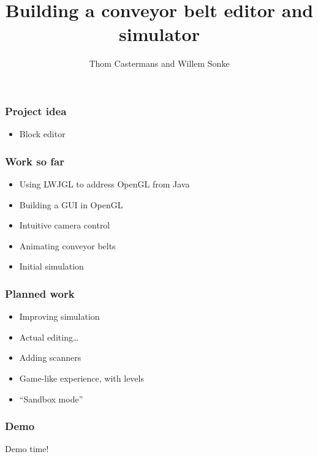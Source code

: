 \documentclass[12pt, aspectratio=169]{beamer} %
\title{Building a conveyor belt editor and simulator}
\author{Thom Castermans and Willem Sonke}
\begin{document}
\begin{titleframe}
\end{titleframe}

\begin{frame}
  \frametitle{Project idea}
  \begin{itemize}
    \item Block editor
  \end{itemize}
\end{frame}

\begin{frame}
  \frametitle{Work so far}
  \begin{itemize}
    \item Using LWJGL to address OpenGL from Java
    \item Building a GUI in OpenGL
    \item Intuitive camera control
    \item Animating conveyor belts
    \item Initial simulation
  \end{itemize}
\end{frame}

\begin{frame}
  \frametitle{Planned work}
  \begin{itemize}
    \item Improving simulation
    \item Actual editing\ldots
    \item Adding scanners
    \item Game-like experience, with levels
    \item ``Sandbox mode''
  \end{itemize}
\end{frame}


\begin{frame}
 \frametitle{Demo}
 \alert{Demo time!}
\end{frame}
\end{document}
